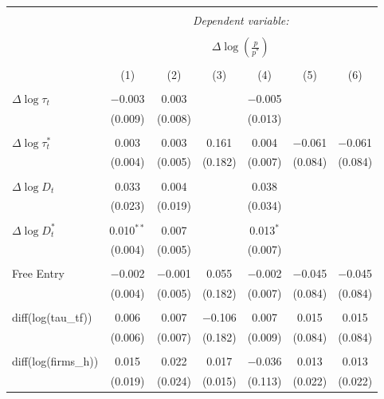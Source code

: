 
\begin{tabular}{@{\extracolsep{5pt}}lcccccc} 
\\[-1.8ex]\hline 
\hline \\[-1.8ex] 
 & \multicolumn{6}{c}{\textit{Dependent variable:}} \\ 
\cline{2-7} 
\\[-1.8ex] & \multicolumn{6}{c}{$\Delta \log \left(\frac{p}{p^*} \right)$} \\ 
\\[-1.8ex] & (1) & (2) & (3) & (4) & (5) & (6)\\ 
\hline \\[-1.8ex] 
 $\Delta \log \tau_t$ & $-$0.003 & 0.003 &  & $-$0.005 &  &  \\ 
  & (0.009) & (0.008) &  & (0.013) &  &  \\ 
  & & & & & & \\ 
 $\Delta \log \tau_t^*$ & 0.003 & 0.003 & 0.161 & 0.004 & $-$0.061 & $-$0.061 \\ 
  & (0.004) & (0.005) & (0.182) & (0.007) & (0.084) & (0.084) \\ 
  & & & & & & \\ 
 $\Delta \log D_t$ & 0.033 & 0.004 &  & 0.038 &  &  \\ 
  & (0.023) & (0.019) &  & (0.034) &  &  \\ 
  & & & & & & \\ 
 $\Delta \log D_t^*$ & 0.010$^{**}$ & 0.007 &  & 0.013$^{*}$ &  &  \\ 
  & (0.004) & (0.005) &  & (0.007) &  &  \\ 
  & & & & & & \\ 
 Free Entry & $-$0.002 & $-$0.001 & 0.055 & $-$0.002 & $-$0.045 & $-$0.045 \\ 
  & (0.004) & (0.005) & (0.182) & (0.007) & (0.084) & (0.084) \\ 
  & & & & & & \\ 
 diff(log(tau\_tf)) & 0.006 & 0.007 & $-$0.106 & 0.007 & 0.015 & 0.015 \\ 
  & (0.006) & (0.007) & (0.182) & (0.009) & (0.084) & (0.084) \\ 
  & & & & & & \\ 
 diff(log(firms\_h)) & 0.015 & 0.022 & 0.017 & $-$0.036 & 0.013 & 0.013 \\ 
  & (0.019) & (0.024) & (0.015) & (0.113) & (0.022) & (0.022) \\ 

\end{tabular}
